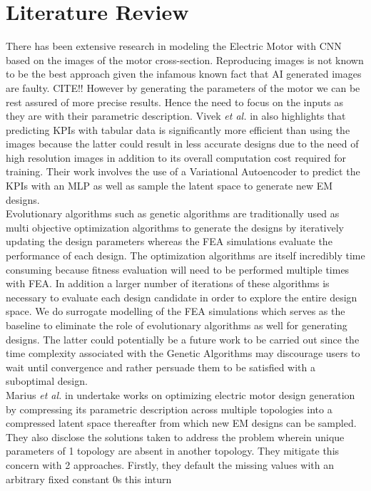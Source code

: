 \documentclass{report} %
\begin{document}
\chapter{Literature Review} 
There has been extensive research in modeling the Electric Motor with \ac{CNN} based on the images of the motor cross-section. 
Reproducing images is not known to be the best approach given the infamous known fact that AI generated images are faulty. CITE!!
However by generating the parameters of the motor we can be rest assured of more precise results. Hence the need to focus on the inputs as they are with their parametric description.
Vivek \textit{et al.} in \cite{VAE-MT-2021} also highlights that predicting \ac{KPI}s with tabular data is significantly more efficient than using the images because the latter could result 
in less accurate designs due to the need of high resolution images in addition to its overall computation cost required for training. Their work 
involves the use of a Variational Autoencoder to predict the \ac{KPI}s with an \ac{MLP} as well as sample the latent space to generate new \ac{EM} designs.\\
Evolutionary algorithms such as genetic algorithms are traditionally used as multi objective optimization algorithms to generate the designs by iteratively
updating the design parameters whereas the \ac{FEA} simulations evaluate the performance of each design. 
The optimization algorithms are itself incredibly time consuming because fitness evaluation will need to be performed multiple times with \ac{FEA}.
In addition a larger number of iterations of these algorithms is necessary to evaluate each design candidate in order to explore the entire design space.
We do surrogate modelling of the \ac{FEA} simulations which serves as the baseline to eliminate the role of evolutionary algorithms as well for generating designs.
The latter could potentially be a future work to be carried out since the time complexity associated with the Genetic Algorithms 
may discourage users to wait until convergence and rather persuade them to be satisfied with a suboptimal design.\\
Marius \textit{et al.} in \cite{VAE-MT-2021} undertake works on optimizing electric motor design generation by compressing its parametric description 
across multiple topologies into a compressed latent space thereafter from which new \ac{EM} designs can be sampled.
They also disclose the solutions taken to address the problem wherein unique parameters of 1 topology are absent in another topology.
They mitigate this concern with 2 approaches. Firstly, they default the missing values with an arbitrary fixed constant 0s this inturn 
\end{document}
